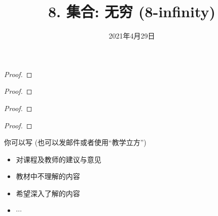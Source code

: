 \documentclass[a4paper, justified]{tufte-handout}
\title{8. 集合: 无穷 (8-infinity)}
\date{2021年4月29日}
\begin{document}
\maketitle
\noplagiarism %
\begin{abstract}
\end{abstract}
\beginrequired

\begin{problem}[\score{7 = 2 + 2 + 3} $\star\star$]
\end{problem}

\begin{proof}
\end{proof}

\begin{problem}[\score{4 = 2 + 2} $\star\star$]
\end{problem}

\begin{proof}
\end{proof}

\begin{problem}
\end{problem}

\begin{proof}
\end{proof}

\begin{problem}[\score{4 = 0 + 4} $\star\star\star$]
\end{problem}

\begin{proof}
\end{proof}

\begincorrection

\beginfb

你可以写 (也可以发邮件或者使用``教学立方'')
\begin{itemize}
  \item 对课程及教师的建议与意见
  \item 教材中不理解的内容
  \item 希望深入了解的内容
  \item $\cdots$
\end{itemize}
\end{document}
